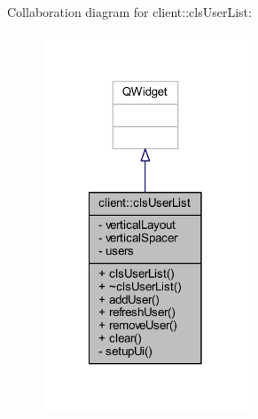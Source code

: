 Collaboration diagram for client\-:\-:cls\-User\-List\-:\nopagebreak
\begin{figure}[H]
\begin{center}
\leavevmode
\includegraphics[width=174pt]{db/dfe/classclient_1_1cls_user_list__coll__graph}
\end{center}
\end{figure}
